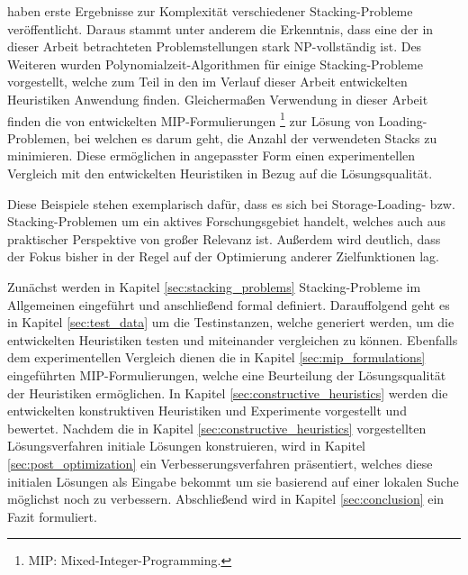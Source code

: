 \citet{Bruns2015} haben erste Ergebnisse zur Komplexität verschiedener Stacking-Probleme veröffentlicht.
Daraus stammt unter anderem die Erkenntnis, dass eine der in dieser Arbeit betrachteten Problemstellungen stark NP-vollständig ist.
Des Weiteren wurden Polynomialzeit-Algorithmen für einige Stacking-Probleme vorgestellt,
welche zum Teil in den im Verlauf dieser Arbeit entwickelten Heuristiken Anwendung finden.\newline
Gleichermaßen Verwendung in dieser Arbeit finden die von \citet{Le2016} entwickelten MIP-Formulierungen
\footnote{MIP: Mixed-Integer-Programming.} zur Lösung von Loading-Problemen, bei welchen es darum geht, die Anzahl der verwendeten Stacks zu minimieren.
Diese ermöglichen in angepasster Form einen experimentellen Vergleich mit den entwickelten Heuristiken in
Bezug auf die Lösungsqualität.

Diese Beispiele stehen exemplarisch dafür, dass es sich bei Storage-Loading- bzw. Stacking-Problemen um
ein aktives Forschungsgebiet handelt, welches auch aus praktischer Perspektive von großer Relevanz ist.
Außerdem wird deutlich, dass der Fokus bisher in der Regel auf der Optimierung anderer Zielfunktionen lag.

\pagebreak

Zunächst werden in Kapitel \ref{sec:stacking_problems} Stacking-Probleme im Allgemeinen
eingeführt und anschließend formal definiert.
Da­r­auf­fol­gend geht es in Kapitel \ref{sec:test_data} um die Testinstanzen, welche generiert werden,
um die entwickelten Heuristiken testen und miteinander vergleichen zu können.
Ebenfalls dem experimentellen Vergleich dienen die in Kapitel \ref{sec:mip_formulations} eingeführten MIP-Formulierungen,
welche eine Beurteilung der Lösungsqualität der Heuristiken ermöglichen. In Kapitel \ref{sec:constructive_heuristics} werden die entwickelten konstruktiven Heuristiken und Experimente vorgestellt und bewertet.
Nachdem die in Kapitel \ref{sec:constructive_heuristics} vorgestellten Lösungsverfahren initiale Lösungen konstruieren, wird in Kapitel \ref{sec:post_optimization} ein Verbesserungsverfahren präsentiert, welches diese initialen Lösungen
als Eingabe bekommt um sie basierend auf einer lokalen Suche möglichst noch zu verbessern.
Abschließend wird in Kapitel \ref{sec:conclusion} ein Fazit formuliert.

\pagebreak
